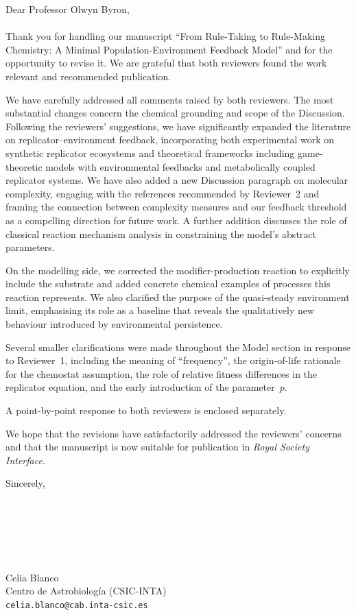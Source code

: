 \documentclass[11pt]{article}
\begin{document}
\noindent Dear Professor Olwyn Byron,
\\
\\
Thank you for handling our manuscript ``From Rule-Taking to Rule-Making Chemistry: A Minimal Population-Environment Feedback Model'' and for the opportunity to revise it. We are grateful that both reviewers found the work relevant and recommended publication.

We have carefully addressed all comments raised by both reviewers. The most substantial changes concern the chemical grounding and scope of the Discussion. Following the reviewers' suggestions, we have significantly expanded the literature on replicator--environment feedback, incorporating both experimental work on synthetic replicator ecosystems and theoretical frameworks including game-theoretic models with environmental feedbacks and metabolically coupled replicator systems. We have also added a new Discussion paragraph on molecular complexity, engaging with the references recommended by Reviewer~2 and framing the connection between complexity measures and our feedback threshold as a compelling direction for future work. A further addition discusses the role of classical reaction mechanism analysis in constraining the model's abstract parameters.

On the modelling side, we corrected the modifier-production reaction to explicitly include the substrate and added concrete chemical examples of processes this reaction represents. We also clarified the purpose of the quasi-steady environment limit, emphasising its role as a baseline that reveals the qualitatively new behaviour introduced by environmental persistence.

Several smaller clarifications were made throughout the Model section in response to Reviewer~1, including the meaning of ``frequency'', the origin-of-life rationale for the chemostat assumption, the role of relative fitness differences in the replicator equation, and the early introduction of the parameter~$p$.

A point-by-point response to both reviewers is enclosed separately. 

We hope that the revisions have satisfactorily addressed the reviewers' concerns and that the manuscript is now suitable for publication in \textit{Royal Society Interface}.

\noindent Sincerely,
\\
\\
\\
\\
\\
\\
\\
\noindent Celia Blanco\\
\small Centro de Astrobiolog\'ia (CSIC-INTA)\\
\small \texttt{celia.blanco@cab.inta-csic.es}
\end{document}
